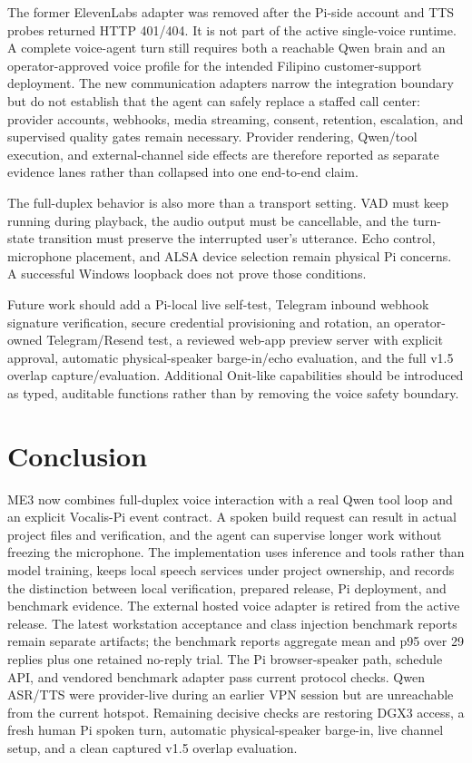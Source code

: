 \documentclass[sigconf,nonacm,balance=false]{acmart}
\begin{document}
The former ElevenLabs adapter was removed after the Pi-side account and TTS
probes returned HTTP 401/404. It is not part of the active single-voice
runtime. A complete voice-agent turn still requires both a reachable Qwen brain
and an operator-approved voice profile for the intended Filipino customer-support deployment. The new
communication adapters narrow the integration boundary but do not establish
that the agent can safely replace a staffed call center: provider accounts,
webhooks, media streaming, consent, retention, escalation, and supervised
quality gates remain necessary. Provider rendering, Qwen/tool execution, and
external-channel side effects are therefore reported as separate evidence
lanes rather than collapsed into one end-to-end claim.

The full-duplex behavior is also more than a transport setting. VAD must keep
running during playback, the audio output must be cancellable, and the
turn-state transition must preserve the interrupted user's utterance. Echo
control, microphone placement, and ALSA device selection remain physical Pi
concerns. A successful Windows loopback does not prove those conditions.

Future work should add a Pi-local live self-test, Telegram inbound webhook
signature verification, secure credential provisioning and rotation, an
operator-owned Telegram/Resend test, a reviewed web-app preview server with
explicit approval, automatic physical-speaker barge-in/echo evaluation, and the full v1.5
overlap capture/evaluation. Additional Onit-like capabilities should be
introduced as typed, auditable functions rather than by removing the voice
safety boundary.

\section{Conclusion}

\noindent ME3 now combines full-duplex voice interaction with a real Qwen tool loop and
an explicit Vocalis-Pi event contract. A
spoken build request can result in actual project files and verification, and
the agent can supervise longer work without freezing the microphone. The
implementation uses inference and tools rather than model training, keeps
local speech services under project ownership, and records the distinction
between local verification, prepared release, Pi deployment, and benchmark
evidence. The external hosted voice adapter is retired from the active release.
The latest workstation acceptance and class injection benchmark reports remain
separate artifacts; the benchmark reports aggregate mean and p95 over 29
replies plus one retained no-reply trial. The Pi browser-speaker path, schedule
API, and vendored benchmark adapter pass current protocol checks. Qwen ASR/TTS
were provider-live during an earlier VPN session but are unreachable from the
current hotspot. Remaining decisive checks are restoring DGX3 access, a fresh
human Pi spoken turn, automatic physical-speaker barge-in, live channel setup,
and a clean captured v1.5 overlap evaluation.
\end{document}
